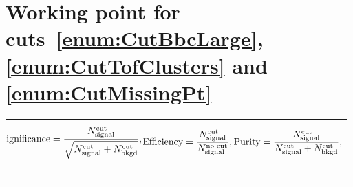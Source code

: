 \section{Working point for cuts~\ref{enum:CutBbcLarge}, \ref{enum:CutTofClusters} and \ref{enum:CutMissingPt}}

\begin{tabulary}{\textwidth}{LLL}
\begin{equation}\label{eq:significance}\hspace*{-10pt}
	\textrm{Significance} = \frac{N_{\textrm{signal}}^{\textrm{cut}}}{\sqrt{N_{\textrm{signal}}^{\textrm{cut}} + N_{\textrm{bkgd}}^{\textrm{cut}}}},
\end{equation}~~~~~~~~~~~~~~~~~&
\begin{equation}\label{eq:efficiency}\hspace*{-10pt}
	\textrm{Efficiency} = \frac{N_{\textrm{signal}}^{\textrm{cut}}}{N_{\textrm{signal}}^{\textrm{no~cut}}},
\end{equation}~~~~~~~~~~~~~~&
\begin{equation}\label{eq:purity}\hspace*{-9pt}
	\textrm{Purity} = \frac{N_{\textrm{signal}}^{\textrm{cut}}}{N_{\textrm{signal}}^{\textrm{cut}}+N_{\textrm{bkgd}}^{\textrm{cut}}},
\end{equation}~~~~~~~~~~~~~~~
\end{tabulary}


